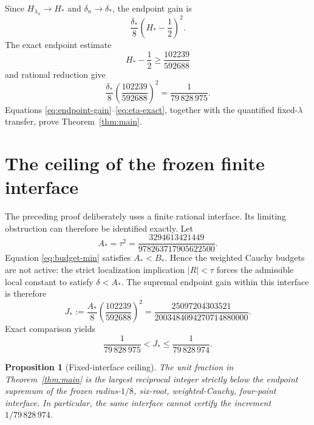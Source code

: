 \documentclass[11pt,reqno]{amsart}
\newtheorem{proposition}[theorem]{Proposition}
\theoremstyle{definition}
\theoremstyle{remark}
\begin{document}
Since $H_{\lambda_n}\to H_*$ and $\delta_n\to\delta_*$, the endpoint gain is
\begin{equation}\label{eq:endpoint-gain}
 \frac{\delta_*}{8}\left(H_*-\frac12\right)^2.
\end{equation}
The exact endpoint estimate
\begin{equation}\label{eq:endpoint-gap}
 H_*-\frac12\ge\frac{102239}{592688}
\end{equation}
and rational reduction give
\begin{equation}\label{eq:eta-exact}
 \frac{\delta_*}{8}
 \left(\frac{102239}{592688}\right)^2
 =\frac1{79\,828\,975}.
\end{equation}
Equations \eqref{eq:endpoint-gain}--\eqref{eq:eta-exact}, together with the
quantified fixed-$\lambda$ transfer, prove Theorem~\ref{thm:main}.

\section{The ceiling of the frozen finite interface}

The preceding proof deliberately uses a finite rational interface.  Its
limiting obstruction can therefore be identified exactly.  Let
\begin{equation}\label{eq:activation}
 A_*=\tau^2=\frac{3294613421449}{978263717905622500}.
\end{equation}
Equation \eqref{eq:budget-min} satisfies $A_*<B_*$.  Hence the weighted
Cauchy budgets are not active: the strict localization implication
$|R|<\tau$ forces the admissible local constant to satisfy $\delta<A_*$.
The supremal endpoint gain within this interface is therefore
\begin{equation}\label{eq:Jstar}
 J_*:=\frac{A_*}{8}
 \left(\frac{102239}{592688}\right)^2
 =\frac{25097204303521}{2003484094270714880000}.
\end{equation}
Exact comparison yields
\begin{equation}\label{eq:unit-ceiling}
 \frac1{79\,828\,975}<J_*\le\frac1{79\,828\,974}.
\end{equation}

\begin{proposition}[Fixed-interface ceiling]\label{prop:ceiling}
The unit fraction in Theorem~\ref{thm:main} is the largest reciprocal integer
strictly below the endpoint supremum of the frozen radius-$1/8$, six-root,
weighted-Cauchy, four-point interface.  In particular, the same interface
cannot certify the increment $1/79\,828\,974$.
\end{proposition}
\end{document}
